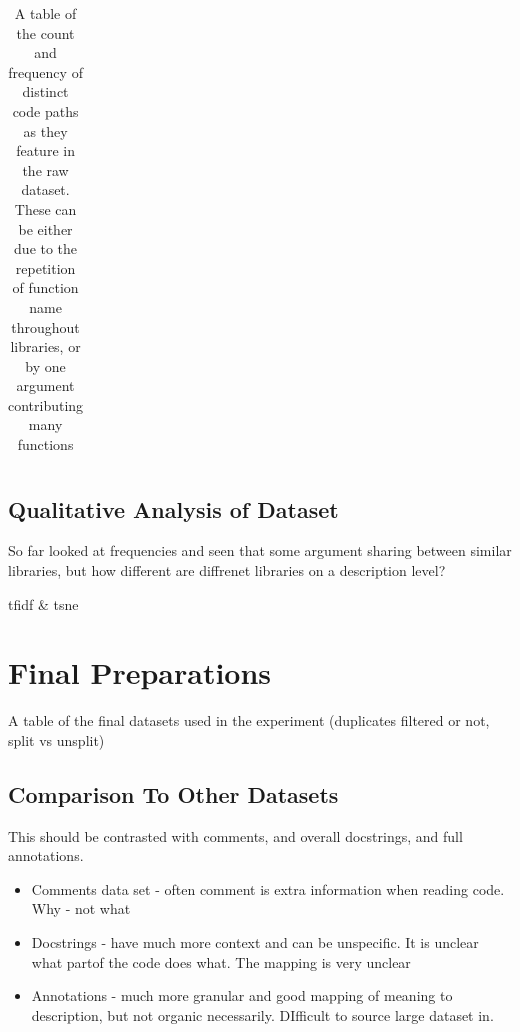 \begin{table}[p]
\begin{center}
\begin{tabular}{c | c | c  }
  \end{tabular}
    \caption { A table of the count and frequency of distinct code paths as they feature in the raw dataset. 
        These can be either due to the repetition of function name throughout libraries, or by one argument contributing many functions }
    \label{table:function_histogram} 

    \end{center}
\end{table}











\subsection{Qualitative Analysis of Dataset} %
\label{sub:qualitative_analysis_}
So far looked at frequencies and seen that some argument sharing between similar libraries, but how different are diffrenet libraries on a description level?


tfidf \& tsne


\section{Final Preparations} %
\label{sec:final_preparations}

A table of the final datasets used in the experiment (duplicates filtered or not, split vs unsplit)



\subsection{Comparison To Other Datasets} %
\label{sub:comparison_to_other_datasets}

    This should be contrasted with comments, and overall docstrings, and full annotations.
    \begin{itemize}
        \item Comments data set - often comment is extra information when reading code. Why - not what
        \item Docstrings - have much more context and can be unspecific. It is unclear what partof the code does what. The mapping is very unclear
        \item Annotations - much more granular and good mapping of meaning to description, but not organic necessarily. DIfficult to source large dataset in.
    \end{itemize}




